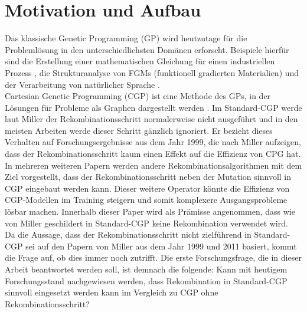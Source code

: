 \chapter{Motivation und Aufbau}
\label{Motivation und Aufbau}

Das klassische Genetic Programming (GP) wird heutzutage für die Problemlösung in den unterschiedlichsten Domänen erforscht.
Beispiele hierfür sind die Erstellung einer mathematischen Gleichung für einen industriellen Prozess \cite{sette_genetic_2001}, die Strukturanalyse von FGMs (funktionell gradierten Materialien) \cite{demirbas_stress_2022} und der Verarbeitung von natürlicher Sprache \cite{araujo_genetic_2020}.\\

Cartesian Genetic Programming (CGP) ist eine Methode des GPs, in der Lösungen für Probleme als Graphen dargestellt werden \cite{miller_cartesian_2020}. 
Im Standard-CGP werde laut Miller der Rekombinationsschritt normalerweise nicht ausgeführt und in den meisten Arbeiten werde dieser Schritt gänzlich ignoriert. 
Er bezieht dieses Verhalten auf Forschungsergebnisse aus dem Jahr 1999, die nach Miller aufzeigen, dass der Rekombinationsschritt kaum einen Effekt auf die Effizienz von CPG hat. \cite{miller_cartesian_2020} 
In mehreren weiteren Papern werden andere Rekombinationsalgorithmen mit dem Ziel vorgestellt, dass der Rekombinationsschritt neben der Mutation sinnvoll in CGP eingebaut werden kann. 
Dieser weitere Operator könnte die Effizienz von CGP-Modellen im Training steigern und somit komplexere Ausgangsprobleme lösbar machen.
Innerhalb dieser Paper wird als Prämisse angenommen, dass wie von Miller geschildert in Standard-CGP keine Rekombination verwendet wird. \cite{clegg_new_2007,kalkreuth_comprehensive_2020, torabi_using_2022}\\
Da die Aussage, dass der Rekombinationsschritt nicht zielführend in Standard-CGP sei auf den Papern von Miller aus dem Jahr 1999 und 2011 basiert, kommt die Frage auf, ob dies immer noch zutrifft.
Die erste Forschungsfrage, die in dieser Arbeit beantwortet werden soll, ist demnach die folgende: \glqq Kann mit heutigem Forschungsstand nachgewiesen werden, dass Rekombination in Standard-CGP sinnvoll eingesetzt werden kann im Vergleich zu CGP ohne Rekombinationsschritt?\grqq\\

